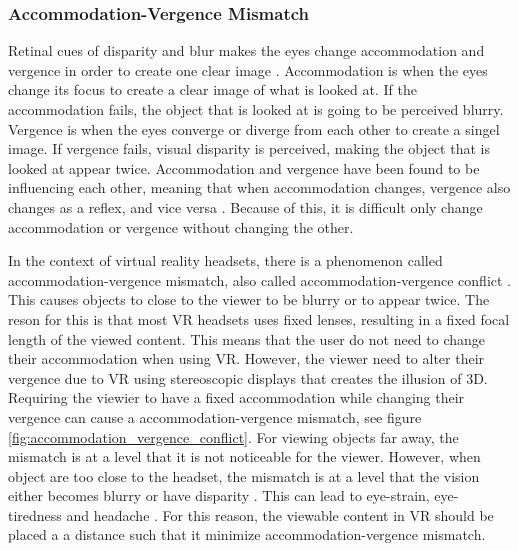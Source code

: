 \documentclass[screen, sigcconf]{timtm}
\begin{document}
\subsubsection{Accommodation-Vergence Mismatch}
Retinal cues of disparity and blur makes the eyes change accommodation and vergence in order to create one clear image \cite{reichelt_depth_2010}. Accommodation is when the eyes change its focus to create a clear image of what is looked at. If the accommodation fails, the object that is looked at is going to be perceived blurry. Vergence is when the eyes converge or diverge from each other to create a singel image. If vergence fails, visual disparity is perceived, making the object that is looked at appear twice. Accommodation and vergence have been found to be influencing each other, meaning that when accommodation changes, vergence also changes as a reflex, and vice versa \cite{suryakumar_vergence_2007}. Because of this, it is difficult only change accommodation or vergence without changing the other.

In the context of virtual reality headsets, there is a phenomenon called accommodation-vergence mismatch, also called accommodation-vergence conflict \cite{kramida_resolving_2016}. This causes objects to close to the viewer to be blurry or to appear twice. The reson for this is that most VR headsets uses fixed lenses, resulting in a fixed focal length of the viewed content. This means that the user do not need to change their accommodation when using VR. However, the viewer need to alter their vergence due to VR using stereoscopic displays that creates the illusion of 3D. Requiring the viewier to have a fixed accommodation while changing their vergence can cause a accommodation-vergence mismatch, see figure \ref{fig:accommodation_vergence_conflict}. For viewing objects far away, the mismatch is at a level that it is not noticeable for the viewer. However, when object are too close to the headset, the mismatch is at a level that the vision either becomes blurry or have disparity \cite{hoffman_vergenceaccommodation_2008}. This can lead to eye-strain, eye-tiredness and headache \cite{shibata_zone_2011}. For this reason, the viewable content in VR should be placed a a distance such that it minimize accommodation-vergence mismatch.
\end{document}
